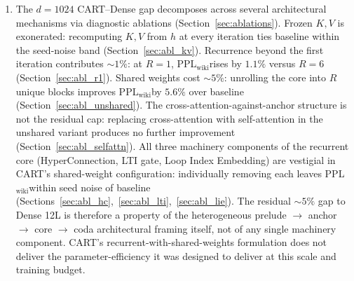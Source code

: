 \documentclass{article}
\newcommand{\cart}{\textsc{CART}}
\newcommand{\pplwiki}{PPL$_\text{wiki}$}
\begin{document}
\begin{enumerate}[leftmargin=*, topsep=2pt, itemsep=1pt]
  \item The $d{=}1024$ \cart{}--Dense gap decomposes across several architectural mechanisms via diagnostic ablations (Section~\ref{sec:ablations}). Frozen $K, V$ is exonerated: recomputing $K, V$ from $h$ at every iteration ties baseline within the seed-noise band (Section~\ref{sec:abl_kv}). Recurrence beyond the first iteration contributes $\sim 1\%$: at $R{=}1$, \pplwiki rises by $1.1\%$ versus $R{=}6$ (Section~\ref{sec:abl_r1}). Shared weights cost $\sim 5\%$: unrolling the core into $R$ unique blocks improves \pplwiki by $5.6\%$ over baseline (Section~\ref{sec:abl_unshared}). The cross-attention-against-anchor structure is not the residual cap: replacing cross-attention with self-attention in the unshared variant produces no further improvement (Section~\ref{sec:abl_selfattn}). All three machinery components of the recurrent core (HyperConnection, LTI gate, Loop Index Embedding) are vestigial in \cart{}'s shared-weight configuration: individually removing each leaves \pplwiki within seed noise of baseline (Sections~\ref{sec:abl_hc},~\ref{sec:abl_lti},~\ref{sec:abl_lie}). The residual $\sim 5\%$ gap to Dense 12L is therefore a property of the heterogeneous prelude $\to$ anchor $\to$ core $\to$ coda architectural framing itself, not of any single machinery component. \cart{}'s recurrent-with-shared-weights formulation does not deliver the parameter-efficiency it was designed to deliver at this scale and training budget.
\end{enumerate}
\end{document}
